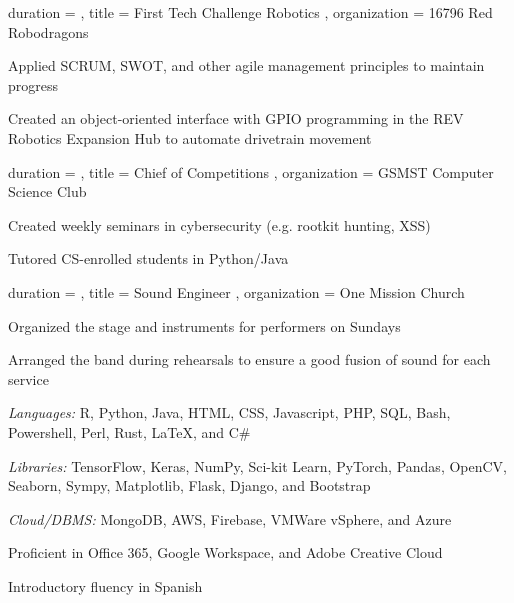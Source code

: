 \documentclass[sidebar-width=2.25in, primary=slate]{clean-resume}
\begin{document}
\begin{main}
    \begin{experience}
      {
        duration = {  },
        title = { First Tech Challenge Robotics },
        organization = { 16796 Red Robodragons }
      }
      \item Applied SCRUM, SWOT, and other agile management principles to maintain progress
      \item Created an object-oriented interface with GPIO programming in the REV Robotics Expansion Hub to automate drivetrain movement
    \end{experience}

    \begin{experience}
      {
        duration = {  },
        title = { Chief of Competitions },
        organization = { GSMST Computer Science Club }
      }
      \item Created weekly seminars in cybersecurity (e.g. rootkit hunting, XSS)
      \item Tutored CS-enrolled students in Python/Java
    \end{experience}

    \begin{experience}
      {
        duration = {  },
        title = { Sound Engineer },
        organization = { One Mission Church }
      }
      \item Organized the stage and instruments for performers on Sundays
      \item Arranged the band during rehearsals to ensure a good fusion of sound for each service
    \end{experience}

    \begin{lst}
      \item \emph{Languages:} R, Python, Java, HTML, CSS, Javascript, PHP, SQL, Bash, Powershell, Perl, Rust, \LaTeX, and C\#
      \item \emph{Libraries:} TensorFlow, Keras, NumPy, Sci-kit Learn, PyTorch, Pandas, OpenCV, Seaborn, Sympy, Matplotlib, Flask, Django, and Bootstrap
      \item \emph{Cloud/DBMS:} MongoDB, AWS, Firebase, VMWare vSphere, and Azure
      \item Proficient in Office 365, Google Workspace, and Adobe Creative Cloud
      \item Introductory fluency in Spanish
    \end{lst}
  \end{main}
\end{document}
